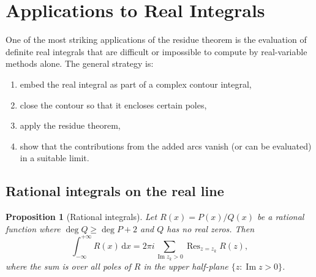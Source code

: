 \documentclass[12pt,a4paper,openany]{book}
\theoremstyle{definition}
\theoremstyle{plain}
\newtheorem{proposition}[definition]{Proposition}
\theoremstyle{remark}
\DeclareMathOperator{\im}{Im}
\DeclareMathOperator{\Res}{Res}
\newcommand{\dd}{\mathrm{d}}
\begin{document}
\section{Applications to Real Integrals}\label{sec:real-integrals}

One of the most striking applications of the residue theorem is the
evaluation of definite real integrals that are difficult or impossible
to compute by real-variable methods alone.  The general strategy is:
\begin{enumerate}[label=(\roman*)]
  \item embed the real integral as part of a complex contour integral,
  \item close the contour so that it encloses certain poles,
  \item apply the residue theorem,
  \item show that the contributions from the added arcs vanish
        (or can be evaluated) in a suitable limit.
\end{enumerate}

\subsection{Rational integrals on the real line}
\label{ssec:rational-integrals}

\begin{proposition}[Rational integrals]\label{prop:rational-integral}
Let $R(x)=P(x)/Q(x)$ be a rational function where
$\deg Q\geq\deg P+2$ and $Q$ has no real zeros.  Then
\[
  \int_{-\infty}^{+\infty}R(x)\,\dd x
  =2\pi i\sum_{\im z_k>0}\Res_{z=z_k}R(z),
\]
where the sum is over all poles of $R$ in the upper half-plane
$\{z:\im z>0\}$.
\end{proposition}
\end{document}
